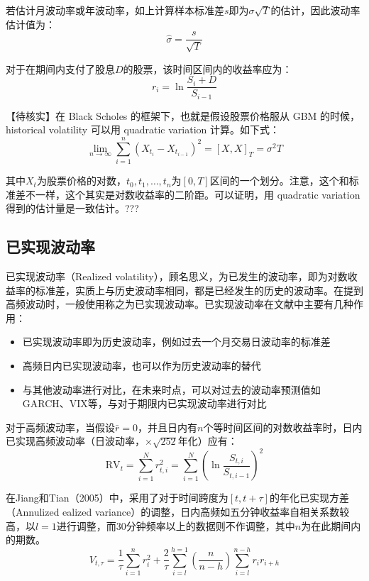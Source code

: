 \documentclass[11pt]{article}
\begin{document}
若估计月波动率或年波动率，如上计算样本标准差$s$即为$\sigma \sqrt{T}$的估计，因此波动率估计值为：
\begin{equation*}
    \hat{\sigma} = \frac{s}{\sqrt{T}}
\end{equation*}

对于在期间内支付了股息$D$的股票，该时间区间内的收益率应为：
\begin{equation*}
    r_i = \ln \frac{S_i + D}{S_{i-1}}
\end{equation*}

【待核实】在 Black Scholes 的框架下，也就是假设股票价格服从 GBM 的时候，historical volatility 可以用 quadratic variation 计算。如下式：
\begin{equation*}
    \lim_{n\rightarrow \infty} \sum^{n}_{i=1}(X_{t_i} - X_{t_{i-1}})^2 = [X,X]_T = \sigma^2 T
\end{equation*}

其中$X_t$为股票价格的对数，$t_0,t_1,\dots,t_n$为$[0,T]$区间的一个划分。注意，这个和标准差不一样，这个其实是对数收益率的二阶距。可以证明，用 quadratic variation 得到的估计量是一致估计。???

\subsection{已实现波动率}

已实现波动率（Realized volatility），顾名思义，为已发生的波动率，即为对数收益率的标准差，实质上与历史波动率相同，都是已经发生的历史的波动率。在提到高频波动时，一般使用称之为已实现波动率。已实现波动率在文献中主要有几种作用：

\begin{itemize}
    \item 已实现波动率即为历史波动率，例如过去一个月交易日波动率的标准差
    \item 高频日内已实现波动率，也可以作为历史波动率的替代
    \item 与其他波动率进行对比，在未来时点，可以对过去的波动率预测值如GARCH、VIX等，与对于期限内已实现波动率进行对比
\end{itemize}

对于高频波动率，当假设$\bar{r} = 0$，并且日内有$n$个等时间区间的对数收益率时，日内已实现高频波动率（日波动率，$\times \sqrt{252}$年化）应有：
\begin{equation*}
    \text{RV}_t = \sum^{N}_{i=1} r^2_{t,i} = \sum^{N}_{i=1} \left( \ln \frac{S_{t,i}}{S_{t,i-1}} \right)^2
\end{equation*}

在Jiang和Tian（2005）中，采用了对于时间跨度为$[t,t+\tau]$的年化已实现方差（Annulized ealized variance）的调整，日内高频如五分钟收益率自相关系数较高，以$l=1$进行调整，而30分钟频率以上的数据则不作调整，其中$n$为在此期间内的期数。
\begin{equation*}
    V_{t,\tau} = \frac{1}{\tau}\sum_{i=1}^{n} r_i^2 + \frac{2}{\tau}\sum_{i=l}^{h=1}\left( \frac{n}{n-h} \right) \sum_{i=l}^{n-h} r_i r_{i+h}
\end{equation*}
\end{document}
